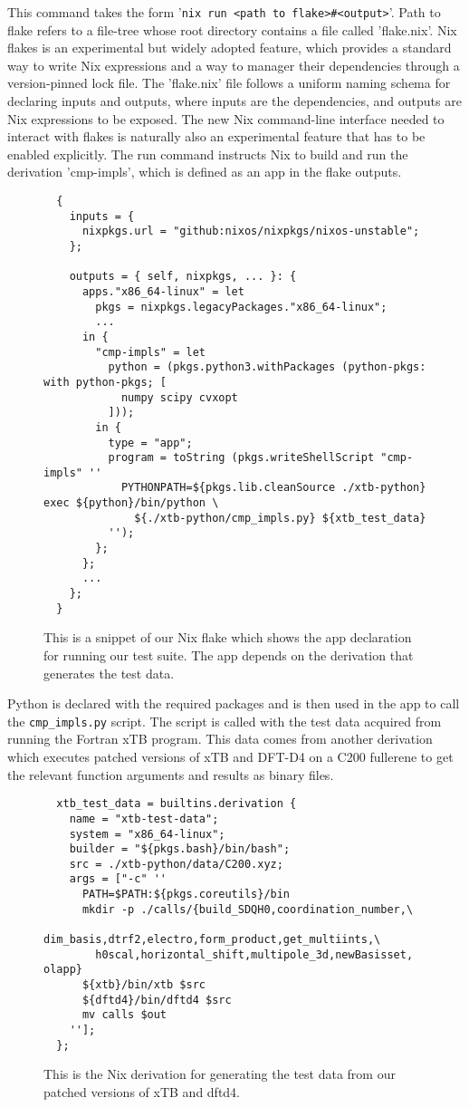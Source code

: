 This command takes the form '\verb|nix run <path to flake>#<output>|'. Path to flake refers to a file-tree whose root directory contains a file called 'flake.nix'. Nix flakes is an experimental but widely adopted feature, which provides a standard way to write Nix expressions and a way to manager their dependencies through a version-pinned lock file. The 'flake.nix' file follows a uniform naming schema for declaring inputs and outputs, where inputs are the dependencies, and outputs are Nix expressions to be exposed.
The new Nix command-line interface needed to interact with flakes is naturally also an experimental feature that has to be enabled explicitly. The run command instructs Nix to build and run the derivation 'cmp-impls', which is defined as an app in the flake outputs.

\newpage

\begin{figure}[H]
\begin{verbatim}
  {
    inputs = {
      nixpkgs.url = "github:nixos/nixpkgs/nixos-unstable";
    };

    outputs = { self, nixpkgs, ... }: {
      apps."x86_64-linux" = let
        pkgs = nixpkgs.legacyPackages."x86_64-linux";
        ...
      in {
        "cmp-impls" = let
          python = (pkgs.python3.withPackages (python-pkgs: with python-pkgs; [
            numpy scipy cvxopt
          ]));
        in {
          type = "app";
          program = toString (pkgs.writeShellScript "cmp-impls" ''
            PYTHONPATH=${pkgs.lib.cleanSource ./xtb-python} exec ${python}/bin/python \
              ${./xtb-python/cmp_impls.py} ${xtb_test_data}
          '');
        };
      };
      ...
    };
  }
\end{verbatim}
\caption{This is a snippet of our Nix flake which shows the app declaration for running our test suite. The app depends on the derivation that generates the test data.}
\label{fig:nix_flake}
\end{figure}

Python is declared with the required packages and is then used in the app to call the \verb|cmp_impls.py| script. The script is called with the test data acquired from running the Fortran xTB program. This data comes from another derivation which executes patched versions of xTB and DFT-D4 on a C200 fullerene to get the relevant function arguments and results as binary files.

\begin{figure}[H]
\begin{verbatim}
  xtb_test_data = builtins.derivation {
    name = "xtb-test-data";
    system = "x86_64-linux";
    builder = "${pkgs.bash}/bin/bash";
    src = ./xtb-python/data/C200.xyz;
    args = ["-c" ''
      PATH=$PATH:${pkgs.coreutils}/bin
      mkdir -p ./calls/{build_SDQH0,coordination_number,\
        dim_basis,dtrf2,electro,form_product,get_multiints,\
        h0scal,horizontal_shift,multipole_3d,newBasisset, olapp}
      ${xtb}/bin/xtb $src
      ${dftd4}/bin/dftd4 $src
      mv calls $out
    ''];
  };
\end{verbatim}
\caption{This is the Nix derivation for generating the test data from our patched versions of xTB and dftd4.}
\label{fig:xtb-test-data}
\end{figure}

